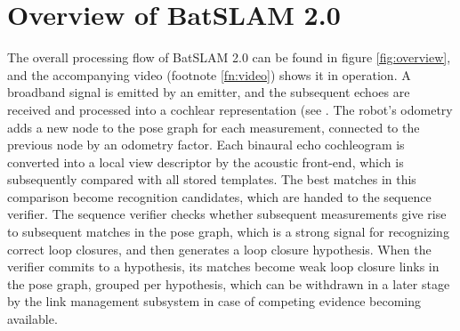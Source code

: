 \documentclass[journal]{IEEEtran}
\begin{document}
\section{Overview of BatSLAM 2.0}
\label{sec:overview}
The overall processing flow of BatSLAM 2.0 can be found in figure \ref{fig:overview}, and the accompanying video (footnote \ref{fn:video}) shows it in operation. A broadband signal is emitted by an emitter, and the subsequent echoes are received and processed into a cochlear representation (see \cite{steckelBatSLAMSimultaneousLocalization2013}. The robot's odometry adds a new node to the pose graph for each measurement, connected to the previous node by an odometry factor. Each binaural echo cochleogram is converted into a local view descriptor by the acoustic front-end, which is subsequently compared with all stored templates. The best matches in this comparison become recognition candidates, which are handed to the sequence verifier. The sequence verifier checks whether subsequent measurements give rise to subsequent matches in the pose graph, which is a strong signal for recognizing correct loop closures, and then generates a loop closure hypothesis. When the verifier commits to a hypothesis, its matches become weak loop closure links in the pose graph, grouped per hypothesis, which can be withdrawn in a later stage by the link management subsystem in case of competing evidence becoming available. 
\end{document}
